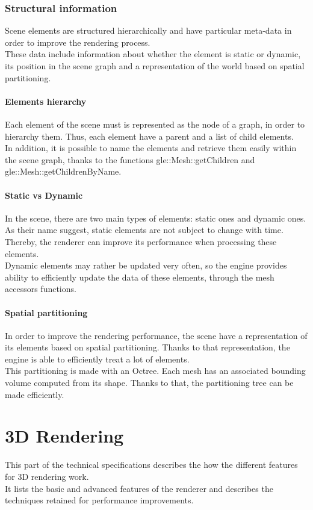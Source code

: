 \documentclass [a4 paper,11pt]{article}
\begin{document}
\section{Structural information}
Scene elements are structured hierarchically and have particular meta-data in order to improve the rendering process.\\
These data include information about whether the element is static or dynamic, its position in the scene graph and a representation of the world based on spatial partitioning.

\subsection{Elements hierarchy}
Each element of the scene must is represented as the node of a graph, in order to hierarchy them. Thus, each element have a parent and a list of child elements.\\
In addition, it is possible to name the elements and retrieve them easily within the scene graph, thanks to the functions gle::Mesh::getChildren and gle::Mesh::getChildrenByName.

\subsection{Static vs Dynamic}
In the scene, there are two main types of elements: static ones and dynamic ones.\\
As their name suggest, static elements are not subject to change with time. Thereby, the renderer can improve its performance when processing these elements.\\
Dynamic elements may rather be updated very often, so the engine provides ability to efficiently update the data of these elements, through the mesh accessors functions.

\subsection{Spatial partitioning}
In order to improve the rendering performance, the scene have a representation of its elements based on spatial partitioning. Thanks to that representation, the engine is able to efficiently treat a lot of elements.\\
This partitioning is made with an Octree. Each mesh has an associated bounding volume computed from its shape. Thanks to that, the partitioning tree can be made efficiently. 

\part{3D Rendering}
This part of the technical specifications describes the how the different features for 3D rendering work.\\
It lists the basic and advanced features of the renderer and describes the techniques retained for performance improvements.
\end{document}
